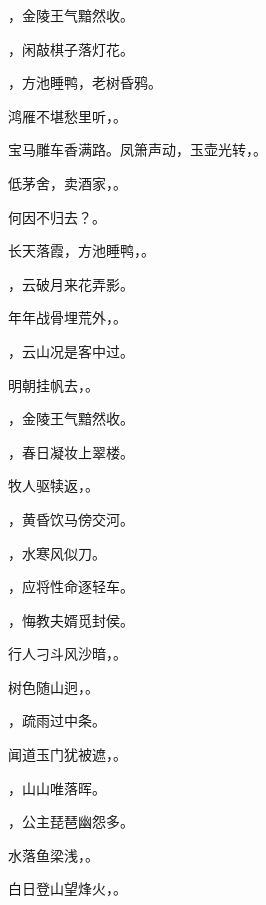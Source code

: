 \documentclass[12pt, a4paper, addpoints]{exam}
\begin{document}
\begin{questions}
\question[1] \uline{\qquad\qquad\qquad}，金陵王气黯然收。

\question[1] \uline{\qquad\qquad\qquad}，闲敲棋子落灯花。

\question[1] \uline{\qquad\qquad\qquad}，方池睡鸭，老树昏鸦。

\question[1] 鸿雁不堪愁里听，\uline{\qquad\qquad\qquad}。

\question[1] 宝马雕车香满路。凤箫声动，玉壶光转，\uline{\qquad\qquad\qquad}。

\question[1] 低茅舍，卖酒家，\uline{\qquad\qquad\qquad}。

\question[1] 何因不归去？\uline{\qquad\qquad\qquad}。

\question[1] 长天落霞，方池睡鸭，\uline{\qquad\qquad\qquad}。

\question[1] \uline{\qquad\qquad\qquad}，云破月来花弄影。

\question[1] 年年战骨埋荒外，\uline{\qquad\qquad\qquad}。

\question[1] \uline{\qquad\qquad\qquad}，云山况是客中过。

\question[1] 明朝挂帆去，\uline{\qquad\qquad\qquad}。

\question[1] \uline{\qquad\qquad\qquad}，金陵王气黯然收。

\question[1] \uline{\qquad\qquad\qquad}，春日凝妆上翠楼。

\question[1] 牧人驱犊返，\uline{\qquad\qquad\qquad}。

\question[1] \uline{\qquad\qquad\qquad}，黄昏饮马傍交河。

\question[1] \uline{\qquad\qquad\qquad}，水寒风似刀。

\question[1] \uline{\qquad\qquad\qquad}，应将性命逐轻车。

\question[1] \uline{\qquad\qquad\qquad}，悔教夫婿觅封侯。

\question[1] 行人刁斗风沙暗，\uline{\qquad\qquad\qquad}。

\question[1] 树色随山迥，\uline{\qquad\qquad\qquad}。

\question[1] \uline{\qquad\qquad\qquad}，疏雨过中条。

\question[1] 闻道玉门犹被遮，\uline{\qquad\qquad\qquad}。

\question[1] \uline{\qquad\qquad\qquad}，山山唯落晖。

\question[1] \uline{\qquad\qquad\qquad}，公主琵琶幽怨多。

\question[1] 水落鱼梁浅，\uline{\qquad\qquad\qquad}。

\question[1] 白日登山望烽火，\uline{\qquad\qquad\qquad}。


\end{questions}
\end{document}
